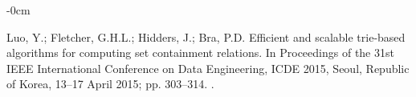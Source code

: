 \documentclass[algorithms,article,accept,pdftex,moreauthors]{Definitions/mdpi}
\begin{document}
\begin{adjustwidth}{-\extralength}{0cm}
\begin{thebibliography}{999}
Luo, Y.; Fletcher, G.H.L.; Hidders, J.; Bra, P.D.
\newblock Efficient and scalable trie-based algorithms for computing set
  containment relations.
\newblock In Proceedings of the 31st {IEEE} International Conference on Data
  Engineering, {ICDE} 2015, Seoul, Republic of Korea,  13--17 April 2015; pp.
  303--314.
.

\end{thebibliography}

\PublishersNote{}
%
%
\end{adjustwidth}
\end{document}
